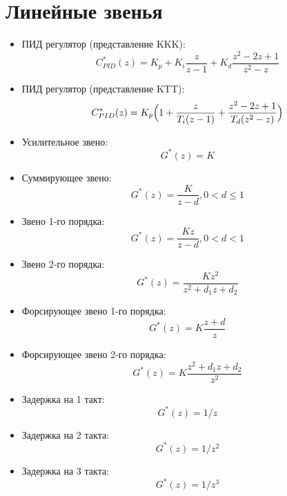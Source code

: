 \documentclass[12pt]{article}
\begin{document}
\section{Линейные звенья}

\begin{itemize}
\item ПИД регулятор (представление KKK):
  $$C_{PID}^*(z)=K_p+K_i\frac{z}{z-1}+K_d\frac{z^2-2z+1}{z^2-z}$$
\item ПИД регулятор (представление KTT):
  $$C_{PID}^*(z)=K_p\Bigl(1+\frac{z}{T_i(z-1)}+\frac{z^2-2z+1}{T_d(z^2-z)}\Bigr)$$

\item Усилительное звено:
$$G^*(z)=K$$
\item Суммирующее звено:
$$G^*(z)=\frac{K}{z-d}, 0<d\le 1$$


\item Звено 1-го порядка:
$$G^*(z)=\frac{Kz}{z-d}, 0<d<1$$
\item Звено 2-го порядка:
$$G^*(z)=\frac{Kz^2}{z^2+d_1z+d_2}$$

\item Форсирующее звено 1-го порядка:
$$G^*(z)=K\frac{z+d}{z}$$
\item Форсирующее звено 2-го порядка:
$$G^*(z)=K\frac{z^2+d_1z+d_2}{z^2}$$


\item Задержка на 1 такт:
$$G^*(z)=1/z$$
\item Задержка на 2 такта:
$$G^*(z)=1/z^2$$
\item Задержка на 3 такта:
$$G^*(z)=1/z^3$$

\end{itemize}
\end{document}
